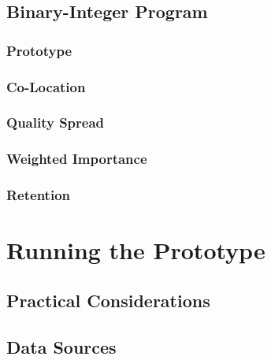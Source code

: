 \documentclass[mnsc,blindrev]{informs3}
\begin{document}


\subsection{Binary-Integer Program}
\label{Matching}



\subsubsection{Prototype}



\subsubsection{Co-Location}
\label{CoLocation}



\subsubsection{Quality Spread}
\label{QualitySpread}



\subsubsection{Weighted Importance}
\label{Importance}



\subsubsection{Retention}
\label{Retention}



\section{Running the Prototype}

\subsection{Practical Considerations}



\subsection{Data Sources}
\end{document}

